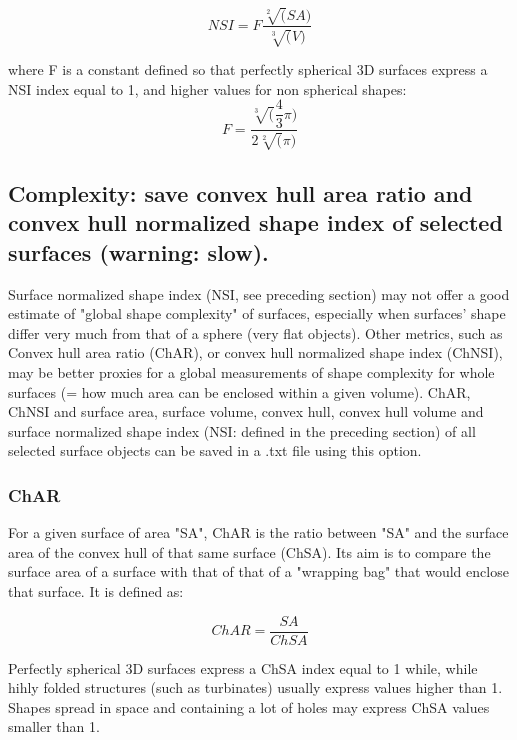 \begin{equation}
NSI = F \dfrac{\sqrt[2](SA)}{\sqrt[3](V)}
\end{equation}

where F is a constant defined so that perfectly spherical 3D surfaces express a NSI index equal to 1, and higher values for non spherical shapes:
\begin{equation}
F = \dfrac{\sqrt[3](\dfrac{4}{3}\pi)}{2\sqrt[2](\pi)}
\end{equation}

\subsection{Complexity: save convex hull area ratio and convex hull normalized shape index of selected surfaces (warning: slow).} \label{global_complexity_2}
\noindent
Surface normalized shape index (NSI, see preceding section) may not offer a good estimate of "global shape complexity" of surfaces, especially when surfaces' shape differ very much from that of a sphere (very flat objects).  
Other metrics, such as Convex hull area ratio (ChAR), or convex hull normalized shape index (ChNSI), may be better proxies for a global measurements of shape complexity for whole surfaces (= how much area can be enclosed within a given volume). 
 ChAR, ChNSI and surface area, surface volume, convex hull, convex hull volume and surface normalized shape index (NSI: defined in the preceding section) of all selected surface objects can be saved in a .txt file using this option.\\

\subsubsection{ChAR}

\noindent For a given surface of area "SA", ChAR is the ratio between "SA" and the surface area of the convex hull of that same surface (ChSA). Its aim is to compare the surface area of a surface with that of that of a "wrapping bag" that would enclose that surface. It is defined as: 


\begin{equation}
ChAR = \dfrac{SA}{ChSA}
\end{equation}

\noindent Perfectly spherical 3D surfaces express a ChSA index equal to 1 while, while hihly folded structures (such as turbinates)  usually express values higher than 1. Shapes spread in space and containing a lot of holes may express ChSA values smaller than 1.


